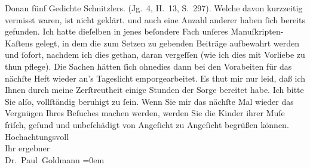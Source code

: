 \begin{ledgroupsized}[t]{13cm}
{{{{                     Donau} fünf Gedichte Schnitzlers.
                     (Jg. 4, H. 13, S. 297). Welche davon kurzzeitig vermisst
                  waren, ist nicht geklärt.}}}\label{K_L02640-1h} und auch eine Anzahl anderer haben ſich bereits
               gefunden. Ich hatte dieſelben in jenes beſondere Fach unſeres Manuſkripten-Kaſtens
               gelegt, in dem die zum Setzen zu gebenden Beiträge aufbewahrt werden und ſofort,
               nachdem ich dies gethan, daran vergeſſen (wie ich dies mit {\pb}Vorliebe zu thun pflege). Die Sachen
               hätten ſich ohnedies dann bei den Vorabeiten für das nächſte Heft wieder an’s Tageslicht
               emporgearbeitet. Es thut mir nur leid, daß ich Ihnen durch meine Zerſtreutheit einige
               Stunden der Sorge bereitet habe. Ich bitte Sie alſo, vollſtändig beruhigt \introOben{}zu\introOben{} ſein. Wenn Sie mir das nächſte Mal wieder das Vergnügen
               Ihres Beſuches machen werden, werden Sie die Kinder ihrer Muſe friſch, geſund und unbeſchädigt von
               Angeſicht zu Angeſicht begrüßen können.\pend
           \pstart
           Hochachtungsvoll {\\[\baselineskip]}Ihr ergebner {\\[\baselineskip]}\spacefill\mbox{Dr. Paul Goldmann}\pend
           \leftskip=0em{}\endnumbering{}\end{ledgroupsized}  \newcommand{\dateiname}{L02640}\newcommand{\titel}{Paul Goldmann an Arthur Schnitzler, 18. 6. 1889}\newcommand{\editorInnen}{Martin Anton Müller und Laura Untner}
      